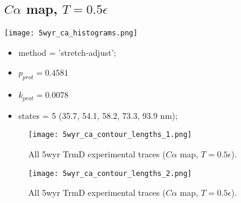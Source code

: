 \subsection{$C\alpha$ map, $T=0.5\epsilon$}
\label{subsec:5wyr-ca}
\begin{minipage}[c]{0.7\textwidth}
    \texttt{[image: 5wyr\_ca\_histograms.png]}
\end{minipage}
\hfill
\begin{minipage}[c]{0.45\textwidth}
    \begin{itemize}
        \item method = 'stretch-adjust';
        \item $p_{prot}=0.4581$
        \item $k_{prot}=0.0078$
        \item states = 5 (35.7, 54.1, 58.2, 73.3, 93.9 nm);
    \end{itemize}
\end{minipage}

\begin{figure}
    \centering
    \texttt{[image: 5wyr\_ca\_contour\_lengths\_1.png]}
    \caption{All 5wyr TrmD experimental traces ($C\alpha$ map, $T=0.5\epsilon$).}
    \label{fig:5wyr-ca-cl1}
\end{figure}

\begin{figure}
    \centering
    \texttt{[image: 5wyr\_ca\_contour\_lengths\_2.png]}
    \caption{All 5wyr TrmD experimental traces ($C\alpha$ map, $T=0.5\epsilon$).}
    \label{fig:5wyr-ca-cl2}
\end{figure}

